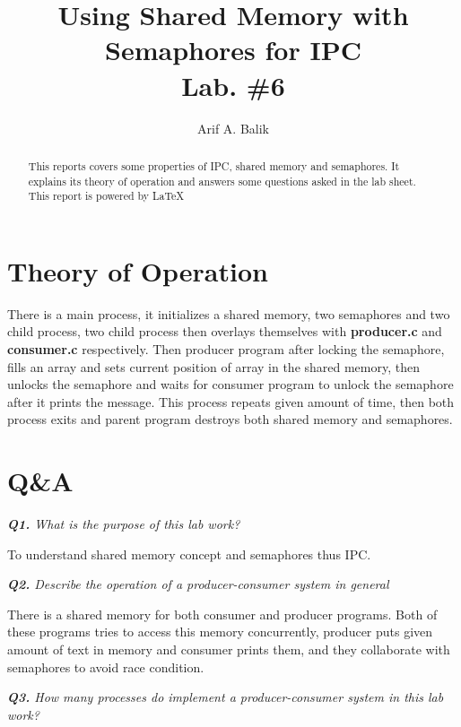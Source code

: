 \documentclass[11pt]{article}
\title{Using Shared Memory with Semaphores for IPC \\Lab. \#6}
\author{Arif A. Balik}
\affil{Undergraduate Student\\
	Sytstems Programming\\
	Department of Computer Science\\
	Arel University\\
	Büyükçekmece, İstanbul 34537\\
    Email: arifbalik@outlook.com
}
\begin{document}
\maketitle

\begin{abstract}

This reports covers some properties of IPC, shared memory and semaphores. It explains its theory of operation and answers some questions asked in the lab sheet.
This report is powered by \LaTeX{}
\end{abstract}

\section*{Theory of Operation}

There is a main process, it initializes a shared memory, two semaphores and two child process, two child process then overlays themselves with \textbf{producer.c} and \textbf{consumer.c} respectively. Then producer program after locking the semaphore, fills an array and sets current position of array in the shared memory, then unlocks the semaphore and waits for consumer program to unlock the semaphore after it prints the message. This process repeats given amount of time, then both process exits and parent program destroys both shared memory and semaphores.

\newpage
\section*{Q\&A}

\vspace{3mm}
\textit{\textbf{Q1.} What is the purpose of this lab work?}
\vspace{3mm}

To understand shared memory concept and semaphores thus IPC.

\vspace{3mm}
\textit{\textbf{Q2.} Describe the operation of a producer-consumer system in general }
\vspace{3mm}

There is a shared memory for both consumer and producer programs. Both of these programs tries to access this memory concurrently, producer puts given amount of text in memory and consumer prints them, and they collaborate with semaphores to avoid race condition. 


\vspace{5mm}
\textit{\textbf{Q3.} How many processes do implement a producer-consumer system in this lab work?}
\vspace{5mm}
\end{document}
